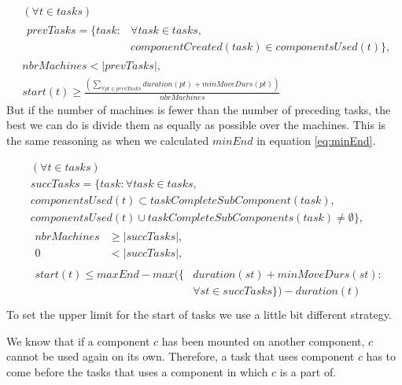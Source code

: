   \begin{equation}
  \begin{aligned}\label{eq:71}
  &(\forall t \in tasks) \\
  &\begin{aligned}
  prevTasks = \{task : &\forall task \in tasks,\\
  &componentCreated(task) \in componentsUsed(t)\},
  \end{aligned} \\
  &nbrMachines < |prevTasks|,  \\
  &start(t) \ge \frac{\left(\sum_{\forall pt \in prevTasks}duration(pt) + minMoveDurs(pt)\right)}{nbrMachines}
  \end{aligned}
  \end{equation}
  But if the number of machines is fewer than the number of preceding tasks, the best we can do is divide them as equally as possible over the machines. This is the same reasoning as when we calculated $minEnd$ in equation \ref{eq:minEnd}.
  
  \begin{equation}\label{eq:72}
  \begin{aligned}
  &(\forall t \in tasks) \\
  &succTasks = \{task : \forall task \in tasks,\\
  &componentsUsed(t) \subset taskCompleteSubComponent(task), \\
  &componentsUsed(t) \cup taskCompleteSubComponents(task) \neq \emptyset\}, \\
  &\begin{aligned}
  nbrMachines &\ge |succTasks|,\\
  0 &< |succTasks|,
  \end{aligned}\\
  &\begin{aligned}
  start(t) \le maxEnd - max(\{&duration(st) + minMoveDurs(st) :\\
  &\forall st \in succTasks\}) - duration(t)
  \end{aligned}\\
  \end{aligned}
  \end{equation}
  To set the upper limit for the start of tasks we use a little bit different strategy.
  
  We know that if a component $c$ has been mounted on another component, $c$ cannot be used again on its own. Therefore, a task that uses component $c$ has to come before the tasks that uses a component in which $c$ is a part of.
  
